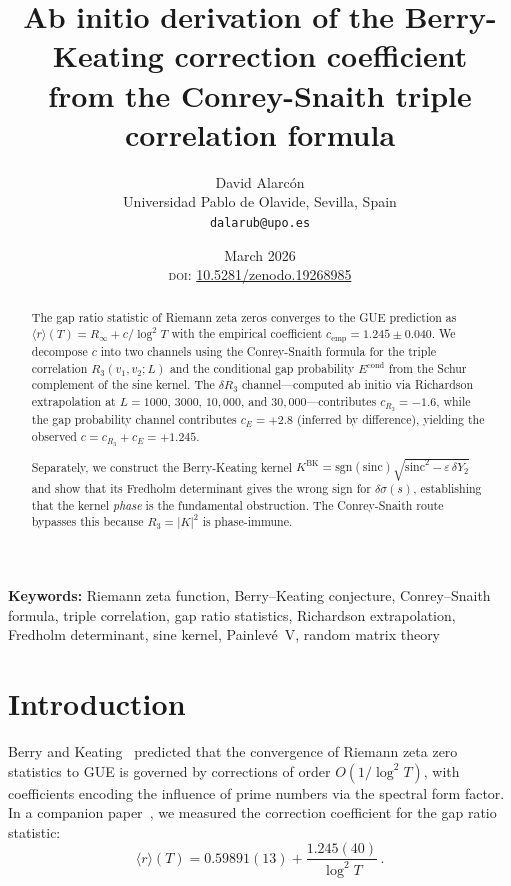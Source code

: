 \documentclass[11pt]{article}
\title{\textbf{Ab initio derivation of the Berry-Keating correction coefficient\\
from the Conrey-Snaith triple correlation formula}}
\author{David Alarc\'on\\
\small Universidad Pablo de Olavide, Sevilla, Spain\\
\small \texttt{dalarub@upo.es}}
\date{March 2026\\[2pt]
\small \textsc{doi}: \href{https://doi.org/10.5281/zenodo.19268985}{10.5281/zenodo.19268985}}
\begin{document}
\maketitle

\begin{abstract}
The gap ratio statistic of Riemann zeta zeros converges to the GUE prediction
as $\langle r\rangle(T) = R_\infty + c/\log^2 T$ with the empirical coefficient
$c_{\mathrm{emp}} = 1.245 \pm 0.040$. We decompose $c$
into two channels using the Conrey-Snaith formula for the triple correlation
$R_3(v_1, v_2; L)$ and the conditional
gap probability $E^{\mathrm{cond}}$ from the Schur complement of the sine kernel.
The $\delta R_3$ channel---computed ab initio via Richardson extrapolation at
$L = 1000$, $3000$, $10{,}000$, and $30{,}000$---contributes $c_{R_3} = -1.6$, while the
gap probability channel contributes $c_{E} = +2.8$ (inferred by difference),
yielding the observed $c = c_{R_3} + c_E = +1.245$.

Separately, we construct the Berry-Keating kernel
$K^{\mathrm{BK}} = \mathrm{sgn}(\mathrm{sinc})\sqrt{\mathrm{sinc}^2 - \varepsilon\,\delta Y_2}$
and show that its Fredholm determinant gives the wrong sign for $\delta\sigma(s)$,
establishing that the kernel \emph{phase} is the fundamental obstruction.
The Conrey-Snaith route bypasses this because $R_3 = |K|^2$ is phase-immune.
\end{abstract}

\bigskip
\noindent\textbf{Keywords:} Riemann zeta function, Berry--Keating conjecture, Conrey--Snaith formula, triple correlation, gap ratio statistics, Richardson extrapolation, Fredholm determinant, sine kernel, Painlev\'e~V, random matrix theory

\bigskip

\section{Introduction}

Berry and Keating~\cite{berry1999, bogomolny1996} predicted that the convergence
of Riemann zeta zero statistics to GUE is governed by corrections of order
$O(1/\log^2 T)$, with coefficients encoding the influence of prime numbers via
the spectral form factor. In a companion paper~\cite{alarcon2026a}, we measured
the correction coefficient for the gap ratio statistic:
\begin{equation}
\langle r\rangle(T) = 0.59891(13) + \frac{1.245(40)}{\log^2 T}\,.
\label{eq:empirical}
\end{equation}
\end{document}
